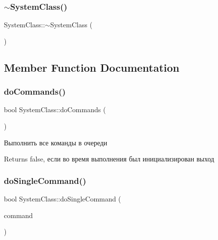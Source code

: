 \subsubsection{\texorpdfstring{$\sim$\+System\+Class()}{~SystemClass()}}
{\footnotesize\ttfamily System\+Class\+::$\sim$\+System\+Class (\begin{DoxyParamCaption}{ }\end{DoxyParamCaption})}



\subsection{Member Function Documentation}
\mbox{\label{class_system_class_a8007871209331455c3f7aa5b2991b061}} 
\subsubsection{\texorpdfstring{do\+Commands()}{doCommands()}}
{\footnotesize\ttfamily bool System\+Class\+::do\+Commands (\begin{DoxyParamCaption}{ }\end{DoxyParamCaption})\hspace{0.3cm}{\ttfamily [private]}}



Выполнить все команды в очереди 

\begin{DoxyReturn}{Returns}
false, если во время выполнения был инициализирован выход 
\end{DoxyReturn}
\mbox{\label{class_system_class_aafe0a61b5a2144016008ca529067862a}} 
\subsubsection{\texorpdfstring{do\+Single\+Command()}{doSingleCommand()}}
{\footnotesize\ttfamily bool System\+Class\+::do\+Single\+Command (\begin{DoxyParamCaption}\item[{\hyperlink{class_command_class}{Command\+Class} $\ast$}]{command }\end{DoxyParamCaption})\hspace{0.3cm}{\ttfamily [private]}}



